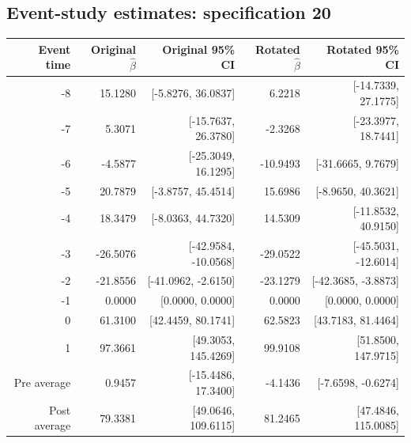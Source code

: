 \documentclass[10pt]{article}
\begin{document}
\subsection*{Event-study estimates: specification 20}
\begin{center}\scriptsize
\begin{tabular}{r rr rr}
\toprule
Event time & Original $\hat\beta$ & Original 95\% CI & Rotated $\hat\beta$ & Rotated 95\% CI \\
\midrule
-8 & 15.1280 & [-5.8276, 36.0837] & 6.2218 & [-14.7339, 27.1775] \\
-7 & 5.3071 & [-15.7637, 26.3780] & -2.3268 & [-23.3977, 18.7441] \\
-6 & -4.5877 & [-25.3049, 16.1295] & -10.9493 & [-31.6665, 9.7679] \\
-5 & 20.7879 & [-3.8757, 45.4514] & 15.6986 & [-8.9650, 40.3621] \\
-4 & 18.3479 & [-8.0363, 44.7320] & 14.5309 & [-11.8532, 40.9150] \\
-3 & -26.5076 & [-42.9584, -10.0568] & -29.0522 & [-45.5031, -12.6014] \\
-2 & -21.8556 & [-41.0962, -2.6150] & -23.1279 & [-42.3685, -3.8873] \\
-1 & 0.0000 & [0.0000, 0.0000] & 0.0000 & [0.0000, 0.0000] \\
0 & 61.3100 & [42.4459, 80.1741] & 62.5823 & [43.7183, 81.4464] \\
1 & 97.3661 & [49.3053, 145.4269] & 99.9108 & [51.8500, 147.9715] \\
\midrule
Pre average & 0.9457 & [-15.4486, 17.3400] & -4.1436 & [-7.6598, -0.6274] \\
Post average & 79.3381 & [49.0646, 109.6115] & 81.2465 & [47.4846, 115.0085] \\
\bottomrule
\end{tabular}
\end{center}
\clearpage
\end{document}
